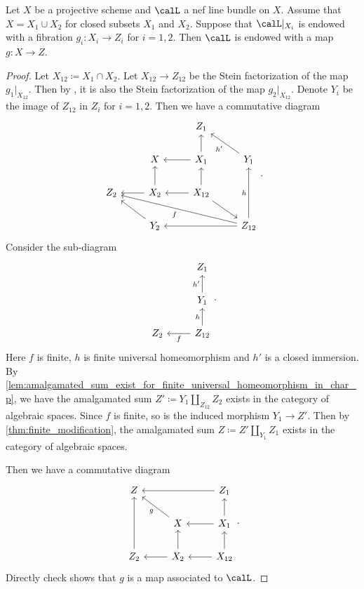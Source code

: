     \begin{proposition}\label{prop:EWM_for_reducible}
        Let \(X\) be a projective scheme and \(\calL\) a nef line bundle on \(X\).
        Assume that \(X = X_1 \cup X_2\) for closed subsets \(X_1\) and \(X_2\).
        Suppose that \(\calL|_{X_i}\) is endowed with a fibration \(g_i:X_i \to Z_i\) for \(i = 1,2\).
        Then \(\calL\) is endowed with a map \(g: X \to Z\).
    \end{proposition}
    \begin{proof}
        Let \(X_{12} \coloneqq X_1 \cap X_2\).
        Let \(X_{12} \to Z_{12}\) be the Stein factorization of the map \(g_1|_{X_{12}}\).
        Then by , it is also the Stein factorization of the map \(g_2|_{X_{12}}\).
        Denote \(Y_i\) be the image of \(Z_{12}\) in \(Z_i\) for \(i=1,2\).
        Then we have a commutative diagram
        \[ \begin{tikzcd}
             & & Z_1 & \\
             & X & X_1 \arrow[l] \arrow[u] & Y_1 \arrow[lu, "h'"] \\
            Z_2 & X_2 \arrow[l] \arrow[u] & X_{12} \arrow[l] \arrow[u] \arrow[rd] & \\
            & Y_2 \arrow[lu] & & Z_{12} \arrow[uu, "h"] \arrow[ll] \arrow[lllu, "f"]
        \end{tikzcd}. \]
        Consider the sub-diagram
        \[ \begin{tikzcd}
            & Z_1 \\
            & Y_1 \arrow[u, "h'"] \\
            Z_2 & Z_{12} \arrow[l, "f"] \arrow[u, "h"]
        \end{tikzcd}. \]
        Here \(f\) is finite, \(h\) is finite universal homeomorphism and \(h'\) is a closed immersion.
        By \cref{lem:amalgamated_sum_exist_for_finite_universal_homeomorphism_in_char_p}, we have the amalgamated sum \(Z' \coloneqq Y_1 \amalg_{Z_{12}} Z_2\) exists in the category of algebraic spaces.
        Since \(f\) is finite, so is the induced morphism \(Y_{1} \to Z'\).
        Then by \cref{thm:finite_modification}, the amalgamated sum \(Z \coloneqq Z' \amalg_{Y_1} Z_1\) exists in the category of algebraic spaces.

        Then we have a commutative diagram
        \[ \begin{tikzcd}
            Z & & Z_1 \arrow[ll] \\
             & X \arrow[lu, "g"] & X_1 \arrow[l] \arrow[u] \\
            Z_2 \arrow[uu] & X_2 \arrow[l] \arrow[u] & X_{12} \arrow[l] \arrow[u]
        \end{tikzcd}. \]
        Directly check shows that \(g\) is a map associated to \(\calL\).
    \end{proof}

